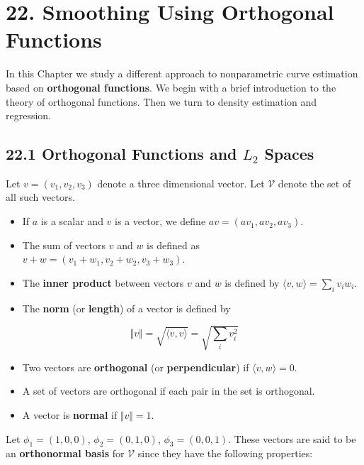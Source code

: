 \section*{22. Smoothing Using Orthogonal Functions}\label{smoothing-using-orthogonal-functions}

In this Chapter we study a different approach to nonparametric curve
estimation based on \textbf{orthogonal functions}. We begin with a brief
introduction to the theory of orthogonal functions. Then we turn to
density estimation and regression.

\subsection*{\texorpdfstring{22.1 Orthogonal Functions and \(L_{2}\) Spaces}{22.1 Orthogonal Functions and L\_{2} Spaces}}\label{orthogonal-functions-and-l_{2}-spaces}

Let \(v = (v_{1}, v_{2}, v_{3})\) denote a three dimensional vector. Let
\(\mathcal{V}\) denote the set of all such vectors.

\begin{itemize}[tightlist]
\item
  If \(a\) is a scalar and \(v\) is a vector, we define
  \(av = (av_{1}, av_{2}, av_{3})\).
\item
  The sum of vectors \(v\) and \(w\) is defined as
  \(v + w = (v_{1} + w_{1}, v_{2} + w_{2}, v_{3} + w_{3})\).
\item
  The \textbf{inner product} between vectors \(v\) and \(w\) is defined
  by \(\langle v, w \rangle = \sum_{i} v_{i} w_{i}\).
\item
  The \textbf{norm} (or \textbf{length}) of a vector is defined by
\end{itemize}

\[ \Vert v \Vert = \sqrt{\langle v, v \rangle} = \sqrt{\sum_{i} v_{i}^{2} }\]

\begin{itemize}[tightlist]
\item
  Two vectors are \textbf{orthogonal} (or \textbf{perpendicular}) if
  \(\langle v, w \rangle = 0\).
\item
  A set of vectors are orthogonal if each pair in the set is orthogonal.
\item
  A vector is \textbf{normal} if \(\Vert v \Vert = 1\).
\end{itemize}

Let \(\phi_{1} = (1, 0, 0)\), \(\phi_{2} = (0, 1, 0)\),
\(\phi_{3} = (0, 0, 1)\). These vectors are said to be an
\textbf{orthonormal basis} for \(\mathcal{V}\) since they have the
following properties:

